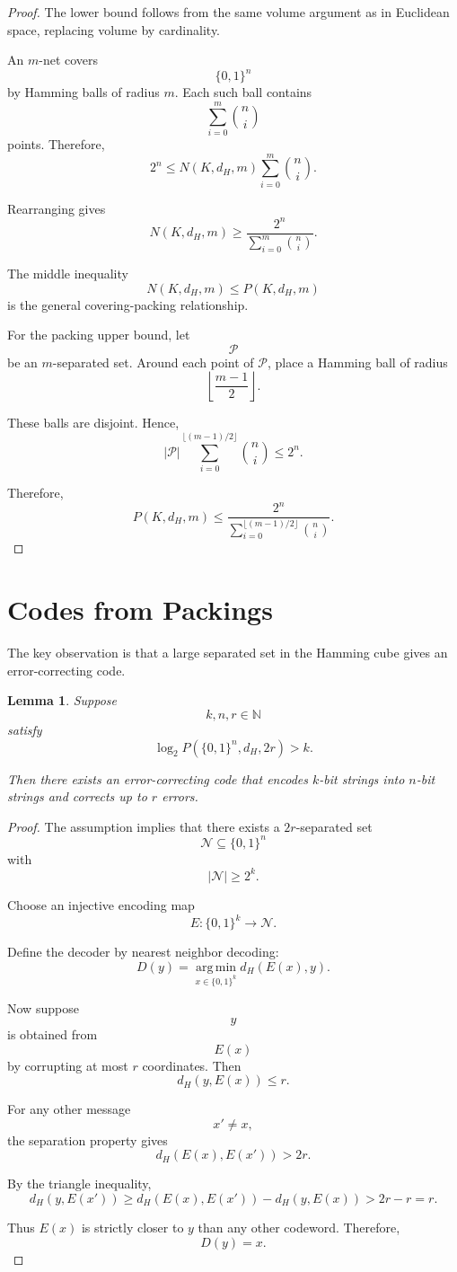 \documentclass[12pt,oneside]{book}
\numberwithin{equation}{section}
\theoremstyle{definition}
\theoremstyle{plain}
\newtheorem{lemma}{Lemma}[section]
\theoremstyle{remark}
\newcommand{\N}{\mathbb{N}}
\newcommand{\argmin}{\operatorname*{arg\,min}}
\begin{document}
\begin{proof}
The lower bound follows from the same volume argument as in Euclidean space, replacing volume by cardinality.

An $m$-net covers
\[
\{0,1\}^n
\]
by Hamming balls of radius $m$. Each such ball contains
\[
\sum_{i=0}^m\binom{n}{i}
\]
points. Therefore,
\[
2^n
\leq
N(K,d_H,m)
\sum_{i=0}^m\binom{n}{i}.
\]

Rearranging gives
\[
N(K,d_H,m)
\geq
\frac{2^n}{\sum_{i=0}^m\binom{n}{i}}.
\]

The middle inequality
\[
N(K,d_H,m)\leq P(K,d_H,m)
\]
is the general covering-packing relationship.

For the packing upper bound, let
\[
\mathcal{P}
\]
be an $m$-separated set. Around each point of $\mathcal{P}$, place a Hamming ball of radius
\[
\left\lfloor\frac{m-1}{2}\right\rfloor.
\]

These balls are disjoint. Hence,
\[
|\mathcal{P}|
\sum_{i=0}^{\lfloor (m-1)/2\rfloor}
\binom{n}{i}
\leq
2^n.
\]

Therefore,
\[
P(K,d_H,m)
\leq
\frac{2^n}{\sum_{i=0}^{\lfloor (m-1)/2\rfloor}\binom{n}{i}}.
\]
\end{proof}

\section{Codes from Packings}

The key observation is that a large separated set in the Hamming cube gives an error-correcting code.

\begin{lemma}
Suppose
\[
k,n,r\in\N
\]
satisfy
\[
\log_2 P(\{0,1\}^n,d_H,2r)>k.
\]

Then there exists an error-correcting code that encodes $k$-bit strings into $n$-bit strings and corrects up to $r$ errors.
\end{lemma}

\begin{proof}
The assumption implies that there exists a $2r$-separated set
\[
\mathcal{N}\subseteq\{0,1\}^n
\]
with
\[
|\mathcal{N}|\geq 2^k.
\]

Choose an injective encoding map
\[
E:\{0,1\}^k\to\mathcal{N}.
\]

Define the decoder by nearest neighbor decoding:
\[
D(y)
=
\argmin_{x\in\{0,1\}^k}
d_H(E(x),y).
\]

Now suppose
\[
y
\]
is obtained from
\[
E(x)
\]
by corrupting at most $r$ coordinates. Then
\[
d_H(y,E(x))\leq r.
\]

For any other message
\[
x'\neq x,
\]
the separation property gives
\[
d_H(E(x),E(x'))>2r.
\]

By the triangle inequality,
\[
d_H(y,E(x'))
\geq
d_H(E(x),E(x'))-d_H(y,E(x))
>
2r-r
=
r.
\]

Thus $E(x)$ is strictly closer to $y$ than any other codeword. Therefore,
\[
D(y)=x.
\]
\end{proof}
\end{document}
